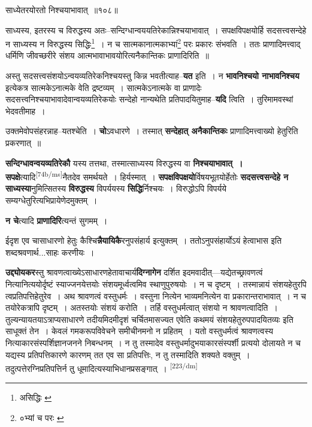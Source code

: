 \documentclass[article,12pt,a4paper]{memoir}
\begin{document}
	  \pstart साध्येतरयोरतो निश्चयाभावात् ॥१०८॥
	\pend
       

	  \pstart साध्यस्य, इतरस्य च विरुद्धस्य अतः--सन्दिग्धान्वययतिरेकान्निश्चयाभावात् । सपक्षविपक्षयोर्हि सदसत्त्वसन्देहे न साध्यस्य न विरुद्धस्य सिद्धिः\footnote{असिद्धिः \cite{dp-msB}} । न च सात्मकानात्मकाभ्यां\footnote{०भ्यां च परः \cite{dp-msA} \cite{dp-msB} \cite{dp-edP} \cite{dp-edH} \cite{dp-edN}} परः प्रकारः संभवति । ततः प्राणादिमत्त्वाद् धर्मिणि जीवच्छरीरे संशय आत्मभावाभावयोरित्यनैकान्तिकः प्राणादिरिति ॥
	\pend
      

	  \pstart अस्तु सदसत्त्वसंशयोऽन्वयव्यतिरेकनिश्चयस्तु किन्न भवतीत्याह--\textbf{यत} इति । न \textbf{भावनिश्चयो नाभावनिश्चय} इत्येकत्र सात्मकेऽनात्मके वेति द्रष्टव्यम् । सात्मकेऽनात्मके वा प्राणादेः सदसत्त्वनिश्चयाभावादेवान्वयव्यतिरेकयोः सन्देहो नान्यथेति प्रतिपादयितुमाह--\textbf{यदि} त्विति । तुरिमामवस्थां भेदवतीमाह ।
	\pend
      

	  \pstart उक्तमेवोपसंहरन्नाह--यतश्चेति । \textbf{चो}ऽवधारणे । तस्मात् \textbf{सन्देहात् अनैकान्तिकः} प्राणादिमत्त्वाख्यो हेतुरिति प्रकरणात् ॥
	\pend
      

	  \pstart \textbf{सन्दिग्धावन्वयव्यतिरेकौ} यस्य तत्तथा, तस्मात्साध्यस्य विरुद्धस्य वा \textbf{निश्चयाभावात् । सपक्षे}त्यादि\leavevmode\textsuperscript{\rmlatinfont\tiny [74b/ms]}नैतदेव समर्थयते । हिर्यस्मात् । \textbf{सपक्षविपक्षयो}र्विषयभूतयोर्हेतोः \textbf{सदसत्त्वसन्देहे न साध्यस्या}नुमित्सितस्य \textbf{विरुद्धस्य} विपर्ययस्य \textbf{सिद्धि}र्निश्चयः । विरुद्धोऽपि विपर्यये सम्यग्धेतुरित्यभिप्रायेणेदमुक्तम् ।
	\pend
      

	  \pstart \textbf{न चे}त्यादि \textbf{प्राणादिरि}त्यन्तं सुगमम् ।
	\pend
      

	  \pstart ईदृश एव चासाधारणो हेतुः कैश्चि\textbf{न्नैयायिकै}रनुपसंहार्य इत्युक्तम् । ततोऽनुपसंहार्योऽयं हेत्वाभास इति शब्दश्रवणार्थ...साहः करणीयः ।
	\pend
      

	  \pstart \textbf{उद्द्योयकर}स्तु श्रावणत्वाख्येऽसाधारणहेतावाचार्य\textbf{दिग्नागेन} दर्शित इदमवादीत्—यद्येतच्छ्रावणत्वं नित्यानित्ययोर्दृष्टं स्याज्जनयेत्तयोः संशयमूर्ध्वत्वमिव स्थाणुपुरुषयोः । न च दृष्टम् । तस्मान्नायं संशयहेतुरपि त्वप्रतिपत्तिहेतुरेव । अथ श्रावणत्वं वस्तुधर्मः । वस्तुना नित्येन भाव्यमनित्येन वा प्रकारान्तराभावात् । न च तयोरेकत्रापि दृष्टम् । अतस्तयोः संशयं करोति । तर्हि वस्तुधर्मत्वात् संशयो न श्रावणत्वादिति । तुल्यन्यायतयाऽत्राप्यसाधारणे तदीयमिदमीदृशं चर्चितमासज्यत एवेति कथमयं संशयहेतुरुपपादयितव्यः इति साधूक्तं तेन । केवलं गमकरूपविवेचने समीचीनमनो न प्रहितम् । यतो वस्तुधर्मत्वं श्रावणत्वस्य नित्याकारसंस्पर्शिज्ञानजनने निबन्धनम् । न तु तस्मादेव वस्तुधर्मादुभयाकारसंस्पर्शी प्रत्ययो दोलायते न च यद्यस्य प्रतिपत्तिकारणे कारणम् तत एव सा प्रतिपत्तिः, न तु तस्मादिति शक्यते वक्तुम् । तदुत्पत्तेरग्निप्रतिपत्तिर्न तु धूमादित्यस्याभिधानप्रसङ्गात् ।
	\pend
      \leavevmode\textsuperscript{\rmlatinfont\tiny [223/dm]}
\end{document}
